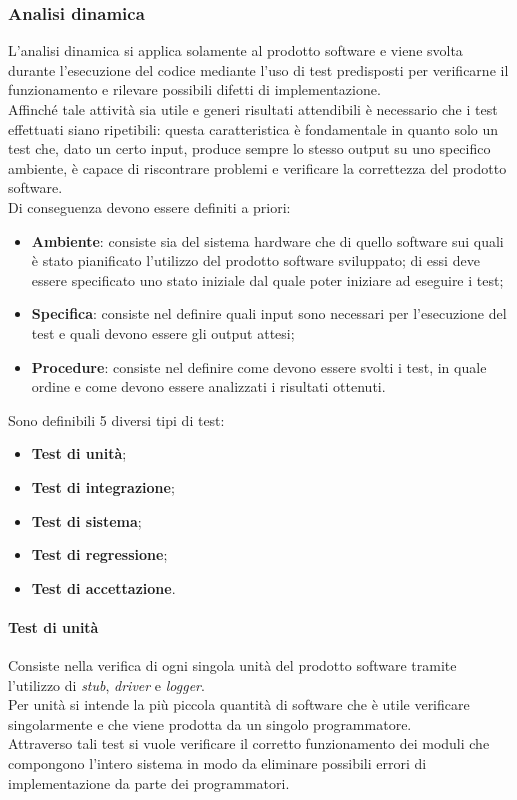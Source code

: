 \subsubsection{Analisi dinamica}
L'analisi dinamica si applica solamente al prodotto software e viene svolta durante l'esecuzione del codice mediante l'uso di test predisposti per verificarne il funzionamento e rilevare possibili difetti di implementazione.\\
Affinché tale attività sia utile e generi risultati attendibili è necessario che i test effettuati siano ripetibili: questa caratteristica è fondamentale in quanto solo un test che, dato un certo input, produce sempre lo stesso output su uno specifico ambiente, è capace di riscontrare problemi e verificare la correttezza del prodotto software.\\
Di conseguenza devono essere definiti a priori:
\begin{itemize}
\item \textbf{Ambiente}: consiste sia del sistema hardware che di quello software sui quali è stato pianificato l'utilizzo del prodotto software sviluppato; di essi deve essere specificato uno stato iniziale dal quale poter iniziare ad eseguire i test;
\item \textbf{Specifica}: consiste nel definire quali input sono necessari per l'esecuzione del test e quali devono essere gli output attesi;
\item \textbf{Procedure}: consiste nel definire come devono essere svolti i test, in quale ordine e come devono essere analizzati i risultati ottenuti.
\end{itemize}
Sono definibili 5 diversi tipi di test:
\begin{itemize}
\item \textbf{Test di unità};
\item \textbf{Test di integrazione};
\item \textbf{Test di sistema};
\item \textbf{Test di regressione};
\item \textbf{Test di accettazione}.
\end{itemize}

\paragraph{Test di unità}
Consiste nella verifica di ogni singola unità del prodotto software tramite l'utilizzo di \textit{stub}, \textit{driver} e \textit{logger}.\\
Per unità si intende la più piccola quantità di software che è utile verificare singolarmente e che viene prodotta da un singolo programmatore.\\
Attraverso tali test si vuole verificare il corretto funzionamento dei moduli che compongono l'intero sistema in modo da eliminare possibili errori di implementazione da parte dei programmatori.

